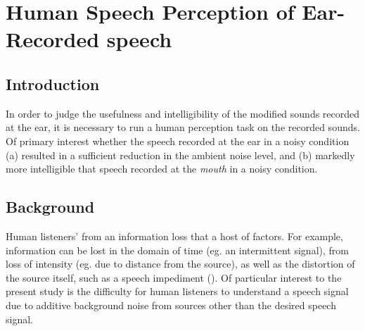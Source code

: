  



\chapter{Human Speech Perception of Ear-Recorded speech\DIFdelbegin %
\DIFdelend \DIFaddbegin \label{chapter3}\DIFaddend }


\section{Introduction}\DIFaddbegin \label{chap3:introduction}
\DIFaddend 

In order to judge the usefulness and intelligibility of the modified sounds recorded at the ear, it is necessary to run a human perception task on the recorded sounds.  Of primary interest \DIFdelbegin {}\DIFdelend \DIFaddbegin {}\DIFaddend whether the speech recorded at the ear in a noisy condition (a) \DIFdelbegin {}\DIFdelend \DIFaddbegin {}\DIFaddend resulted in a sufficient reduction in the ambient noise level, and (b) \DIFdelbegin {}\DIFdelend \DIFaddbegin {}\DIFaddend markedly more intelligible that speech recorded at the \textit{mouth} in a noisy condition.

\section{Background}\DIFdelbegin %
\DIFdelend \DIFaddbegin \label{chap3:background}
\DIFaddend 

Human listeners' \DIFdelbegin {}\DIFdelend \DIFaddbegin {}\DIFaddend from an information loss that \DIFdelbegin {}\DIFdelend \DIFaddbegin {}\DIFaddend a host of factors.  For example, information can be lost in the domain of time (eg. an intermittent signal), \DIFdelbegin {}\DIFdelend from loss of intensity (eg. due to distance from the source), as well as the \DIFaddbegin {}\DIFaddend distortion of the source itself, such as a speech impediment (\cite{mattys:12}).  Of particular interest to the present study is the difficulty for human listeners to \DIFdelbegin {}\DIFdelend understand a speech signal due to \DIFaddbegin {}\DIFaddend additive background noise from sources other than the desired speech signal.

